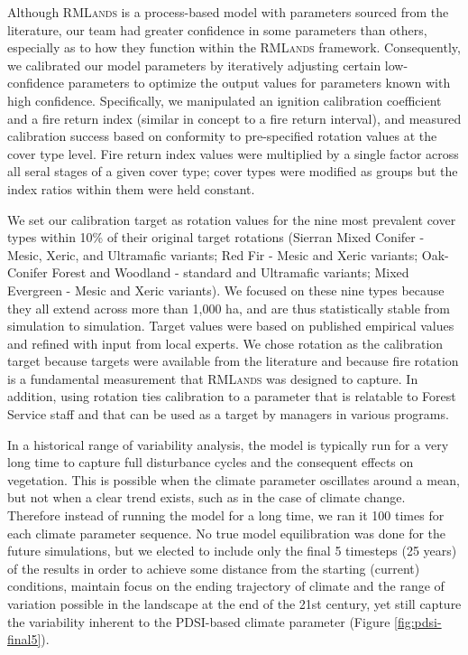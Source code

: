 Although \textsc{RMLands} is a process-based model with parameters sourced from the literature, our team had greater confidence in some parameters than others, especially as to how they function within the \textsc{RMLands} framework. Consequently, we calibrated our model parameters by iteratively adjusting certain low-confidence parameters to optimize the output values for parameters known with high confidence. Specifically, we manipulated an ignition calibration coefficient and a fire return index (similar in concept to a fire return interval), and measured calibration success based on conformity to pre-specified rotation values at the cover type level. Fire return index values were multiplied by a single factor across all seral stages of a given cover type; cover types were modified as groups but the index ratios within them were held constant.

We set our calibration target as rotation values for the nine most prevalent cover types within 10\% of their original target rotations (Sierran Mixed Conifer - Mesic, Xeric, and Ultramafic variants; Red Fir - Mesic and Xeric variants; Oak-Conifer Forest and Woodland - standard and Ultramafic variants; Mixed Evergreen - Mesic and Xeric variants). We focused on these nine types because they all extend across more than 1,000 ha, and are thus statistically stable from simulation to simulation. Target values were based on published empirical values and refined with input from local experts. We chose rotation as the calibration target because targets were available from the literature and because fire rotation is a fundamental measurement that \textsc{RMLands} was designed to capture. In addition, using rotation ties calibration to a parameter that is relatable to Forest Service staff and that can be used as a target by managers in various programs.

In a historical range of variability analysis, the model is typically run for a very long time to capture full disturbance cycles and the consequent effects on vegetation. This is possible when the climate parameter oscillates around a mean, but not when a clear trend exists, such as in the case of climate change. Therefore instead of running the model for a long time, we ran it 100 times for each climate parameter sequence. No true model equilibration was done for the future simulations, but we elected to include only the final 5 timesteps (25 years) of the results in order to achieve some distance from the starting (current) conditions, maintain focus on the ending trajectory of climate and the range of variation possible in the landscape at the end of the 21st century, yet still capture the variability inherent to the PDSI-based climate parameter (Figure \ref{fig:pdsi-final5}).



